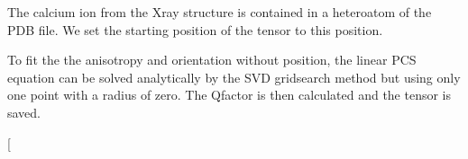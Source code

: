 \documentclass[a4paper,10pt,english,openany,oneside]{sphinxmanual}
\begin{document}
\sphinxAtStartPar
The calcium ion from the X\sphinxhyphen{}ray structure is contained in a heteroatom of the PDB file. We set the starting position of the tensor to this position.

\begin{sphinxVerbatim}[commandchars=\\\{\}]
  \PYG{p}{[}\PYG{p}{]}\PYG{p}{[}\PYG{p}{]}\PYG{p}{[}  \PYG{p}{]}\PYG{p}{[}\PYG{p}{]}
\end{sphinxVerbatim}

\sphinxAtStartPar
To fit the the anisotropy and orientation without position, the linear PCS equation can be solved analytically by the SVD gridsearch method but using only one point with a radius of zero. The Q\sphinxhyphen{}factor is then calculated and the tensor is saved.

\begin{sphinxVerbatim}[commandchars=\\\{\}]
\PYG{p}{[}\PYG{p}{]} \PYG{p}{[}\PYG{p}{]}  
	\PYG{p}{[}\PYG{p}{]}\PYG{p}{[}\PYG{p}{]}  

  

\end{sphinxVerbatim}

\sphinxAtStartPar
{} {[}\sphinxcode{\sphinxupquote{pcs\_fit\_constrained.png}}{]}
\end{document}
